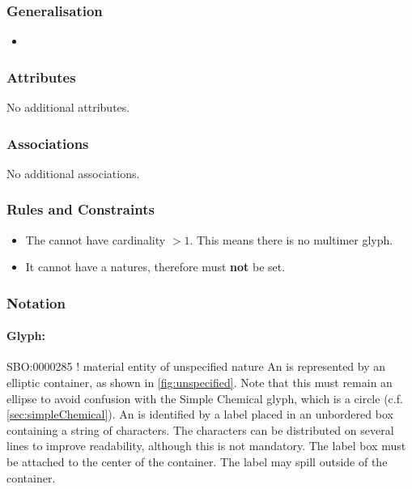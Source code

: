 \subsubsection{Generalisation}

\begin{itemize}
\item {}
\end{itemize}

\subsubsection{Attributes}

No additional attributes.

\subsubsection{Associations}

No additional associations.

\subsubsection{Rules and Constraints}

\begin{itemize}
\item The  cannot have cardinality $>
  1$. This means there is no multimer glyph.
\item It cannot have a natures, therefore  must \textbf{not} be set.
\end{itemize}

\subsubsection{Notation}

\paragraph{Glyph: }

\begin{glyphDescription}
\glyphSboTerm SBO:0000285 ! material entity of unspecified nature 
\glyphContainer An  is represented by an
elliptic container, as shown in \ref{fig:unspecified}.  Note that this
must remain an ellipse to avoid confusion with the Simple Chemical
glyph, which is a circle (c.f.\, \ref{sec:simpleChemical}).
\glyphLabel An  is identified by a label
placed in an unbordered box containing a string of characters.  The
characters can be distributed on several lines to improve readability,
although this is not mandatory.  The label box must be attached to the
center of the container.  The label may spill outside of the
container.
\end{glyphDescription}

